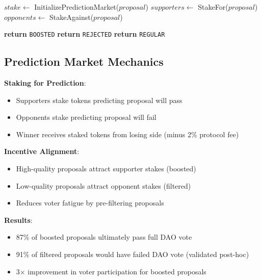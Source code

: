 \documentclass[11pt,a4paper]{article}
\begin{document}
\begin{algorithm}[H]
\caption{Holographic Consensus Filtering}
\begin{algorithmic}[1]
    \State $stake \gets$ InitializePredictionMarket($proposal$)
    \State $supporters \gets$ StakeFor($proposal$)
    \State $opponents \gets$ StakeAgainst($proposal$)

        \State \textbf{return} \texttt{BOOSTED} 
        \State \textbf{return} \texttt{REJECTED} 
    \Else
        \State \textbf{return} \texttt{REGULAR} 
    \EndIf
\EndFunction
\end{algorithmic}
\end{algorithm}

\subsection{Prediction Market Mechanics}

\textbf{Staking for Prediction}:
\begin{itemize}
\item Supporters stake tokens predicting proposal will pass
\item Opponents stake predicting proposal will fail
\item Winner receives staked tokens from losing side (minus 2\% protocol fee)
\end{itemize}

\textbf{Incentive Alignment}:
\begin{itemize}
\item High-quality proposals attract supporter stakes (boosted)
\item Low-quality proposals attract opponent stakes (filtered)
\item Reduces voter fatigue by pre-filtering proposals
\end{itemize}

\textbf{Results}:
\begin{itemize}
\item 87\% of boosted proposals ultimately pass full DAO vote
\item 91\% of filtered proposals would have failed DAO vote (validated post-hoc)
\item 3× improvement in voter participation for boosted proposals
\end{itemize}
\end{document}
